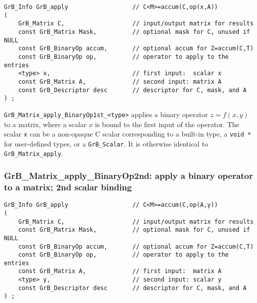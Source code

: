 \documentclass[12pt]{article}
\begin{document}
\begin{mdframed}[userdefinedwidth=6in]
{\footnotesize
\begin{verbatim}
GrB_Info GrB_apply                  // C<M>=accum(C,op(x,A))
(
    GrB_Matrix C,                   // input/output matrix for results
    const GrB_Matrix Mask,          // optional mask for C, unused if NULL
    const GrB_BinaryOp accum,       // optional accum for Z=accum(C,T)
    const GrB_BinaryOp op,          // operator to apply to the entries
    <type> x,                       // first input:  scalar x
    const GrB_Matrix A,             // second input: matrix A
    const GrB_Descriptor desc       // descriptor for C, mask, and A
) ;
\end{verbatim} } \end{mdframed}

\verb'GrB_Matrix_apply_BinaryOp1st_<type>'  applies a binary operator
$z=f(x,y)$ to a matrix, where a scalar $x$ is bound to the first input of the
operator.
The scalar \verb'x' can be a non-opaque C scalar corresponding to a built-in
type, a \verb'void *' for user-defined types, or a \verb'GrB_Scalar'.
It is otherwise identical to \verb'GrB_Matrix_apply'.

\newpage
\subsubsection{{\sf GrB\_Matrix\_apply\_BinaryOp2nd:} apply a binary operator to a matrix; 2nd scalar binding}
\label{matrix_apply2nd}

\begin{mdframed}[userdefinedwidth=6in]
{\footnotesize
\begin{verbatim}
GrB_Info GrB_apply                  // C<M>=accum(C,op(A,y))
(
    GrB_Matrix C,                   // input/output matrix for results
    const GrB_Matrix Mask,          // optional mask for C, unused if NULL
    const GrB_BinaryOp accum,       // optional accum for Z=accum(C,T)
    const GrB_BinaryOp op,          // operator to apply to the entries
    const GrB_Matrix A,             // first input:  matrix A
    <type> y,                       // second input: scalar y
    const GrB_Descriptor desc       // descriptor for C, mask, and A
) ;
\end{verbatim} } \end{mdframed}
\end{document}
